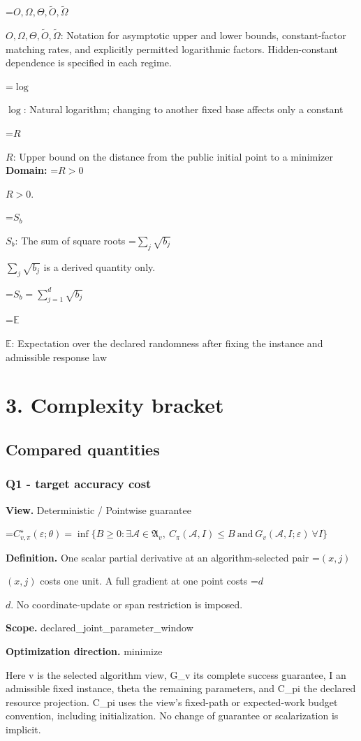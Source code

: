 \documentclass[10pt,a4paper]{article}
\newcommand{\AtlasMath}[1]{\par\begingroup\centering\setbox0=\hbox{$\displaystyle #1$}\ifdim\wd0>1.4\linewidth\typeout{ATLAS WIDE FORMULA: \the\wd0}\fi\ifdim\wd0>\linewidth\resizebox{\linewidth}{!}{\box0}\else\box0\fi\par\endgroup}
\newcommand{\AtlasInlineMath}[1]{\begingroup\setbox0=\hbox{$#1$}\ifdim\wd0>.4\linewidth\endgroup\AtlasMath{#1}\else\endgroup$#1$\fi}
\begin{document}
\AtlasInlineMath{O,\Omega,\Theta,\widetilde{O},\widetilde\Omega}: Notation for asymptotic upper and lower bounds, constant-factor matching rates, and explicitly permitted logarithmic factors. Hidden-constant dependence is specified in each regime.

\AtlasInlineMath{\log}: Natural logarithm; changing to another fixed base affects only a constant

\AtlasInlineMath{R}: Upper bound on the distance from the public initial point to a minimizer \textbf{Domain:} \AtlasInlineMath{R>0}.

\AtlasInlineMath{S_b}: The sum of square roots \AtlasInlineMath{\sum_j\sqrt{b_j}} is a derived quantity only.


\AtlasMath{S_b=\sum_{j=1}^d\sqrt{b_j}}


\AtlasInlineMath{\mathbb{E}}: Expectation over the declared randomness after fixing the instance and admissible response law

\section{3. Complexity bracket}
\subsection{Compared quantities}
\subsubsection{Q1 - target accuracy cost}
\textbf{View.} Deterministic / Pointwise guarantee

\AtlasMath{C^\star_{v,\pi}(\varepsilon;\theta)=\inf\{B\ge0:\exists\mathcal A\in\mathfrak A_v,\ C_\pi(\mathcal A,I)\le B\ \text{and}\ G_v(\mathcal A,I;\varepsilon)\ \forall I\}}
\textbf{Definition.} One scalar partial derivative at an algorithm-selected pair \AtlasInlineMath{(x,j)} costs one unit. A full gradient at one point costs \AtlasInlineMath{d}. No coordinate-update or span restriction is imposed.

\textbf{Scope.} declared\_joint\_parameter\_window

\textbf{Optimization direction.} minimize

Here v is the selected algorithm view, G\_v its complete success guarantee, I an admissible fixed instance, theta the remaining parameters, and C\_pi the declared resource projection. C\_pi uses the view's fixed-path or expected-work budget convention, including initialization. No change of guarantee or scalarization is implicit.
\end{document}
